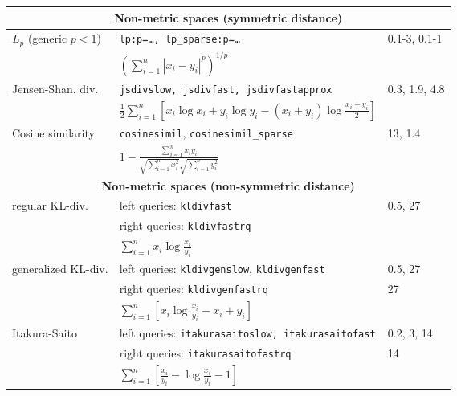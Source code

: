 \documentclass[runningheads,a4paper]{llncs}
\newcommand{\ttt}[1]{\texttt{#1}}
\begin{document}
\begin{table}
\begin{tabular}{l@{\hspace{2mm}}l@{\hspace{2mm}}l}
\toprule
\multicolumn{3}{c}{\textbf{Non-metric spaces (symmetric distance)}}  \\
\toprule
$L_p$ (generic $p < 1$)& \ttt{lp:p=\ldots, lp\_sparse:p=\ldots}                     &  0.1-3, 0.1-1 \\
                              & $\left(\sum_{i=1}^n |x_i-y_i|^p\right)^{1/p}$  &   \\
\cmidrule(l){1-3} 
Jensen-Shan. div. &\ttt{jsdivslow, jsdivfast, jsdivfastapprox} &   0.3, 1.9, 4.8 \\
                          & $\frac{1}{2}\sum_{i=1}^n \left[x_i \log x_i + y_i \log y_i  - (x_i+y_i)\log \frac{x_i +y_i}{2}\right]$ & \\
\cmidrule(l){1-3} 
Cosine similarity & \ttt{cosinesimil}, \ttt{cosinesimil\_sparse} & { 13, 1.4 } \\
                        & $1-\frac{\sum_{i=1}^n x_i y_i}{\sqrt{\sum_{i=1}^n x_i^2}\sqrt{\sum_{i=1}^n y_i^2 }}$   & \vspace{1em} \\
\toprule
\multicolumn{3}{c}{\textbf{Non-metric spaces (non-symmetric distance)}}  \\
\toprule
regular KL-div. & left queries: \ttt{kldivfast}       & 0.5, 27 \\
                       & right queries: \ttt{kldivfastrq}    &  \\
                       & $\sum_{i=1}^n   x_i \log \frac{x_i}{y_i}$  & \\ 
\cmidrule(l){1-3} 
generalized KL-div. & left queries: \ttt{kldivgenslow}, \ttt{kldivgenfast} & 0.5, 27    \\
                           & right queries: \ttt{kldivgenfastrq} & 27    \\
                           & $\sum_{i=1}^n \left[  x_i \log \frac{x_i}{y_i} -   x_i +   y_i \right]$   &   \\
\cmidrule(l){1-3} 
Itakura-Saito & left queries: \ttt{itakurasaitoslow, itakurasaitofast}   & 0.2, 3, 14 \\
              & right queries: \ttt{itakurasaitofastrq}                  & 14         \\
              & $\sum_{i=1}^n \left[ \frac{ x_i}{y_i} - \log \frac{x_i}{y_i}  -1 \right]$ \\
\toprule
\end{tabular}
\end{table}
\end{document}
